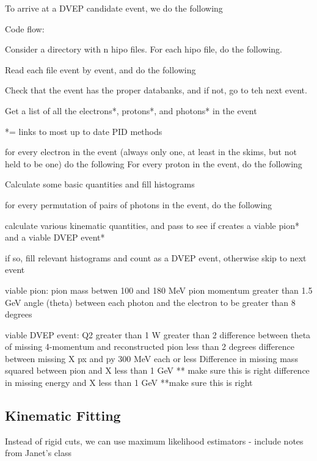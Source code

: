     
    
    
    
    
    
    To arrive at a DVEP candidate event, we do the following
    
    
    Code flow:
    
    Consider a directory with n hipo files. For each hipo file, do the following.
    
    Read each file event by event, and do the following
    
    Check that the event has the proper databanks, and if not, go to teh next event.
    
    Get a list of all the electrons*, protons*, and photons* in the event
    
    *= links to most up to date PID methods
    
    for every electron in the event (always only one, at least in the skims, but not held to be one) do the following
    For every proton in the event, do the following
    
    Calculate some basic quantities and fill histograms
    
    for every permutation of pairs of photons in the event, do the following
    
    calculate various kinematic quantities, and pass to see if creates a viable pion* and a viable DVEP event*
    
    if so, fill relevant histograms and count as a DVEP event, otherwise skip to next event
    
    viable pion: 
    pion mass betwen 100 and 180 MeV
    pion momentum greater than 1.5 GeV
    angle (theta) between each photon and the electron to be greater than 8 degrees
    
    viable DVEP event:
    Q2 greater than 1
    W greater than 2
    difference between theta of missing 4-momentum and reconstructed pion less than 2 degrees
    difference between missing X px and py 300 MeV each or less
    Difference in missing mass squared between pion and X less than 1 GeV ** make sure this is right
    difference in missing energy and X less than 1 GeV **make sure this is right
    

\iffalse
\subsection{Kinematic Fitting}

    Instead of rigid cuts, we can use maximum likelihood estimators - include notes from Janet's class

